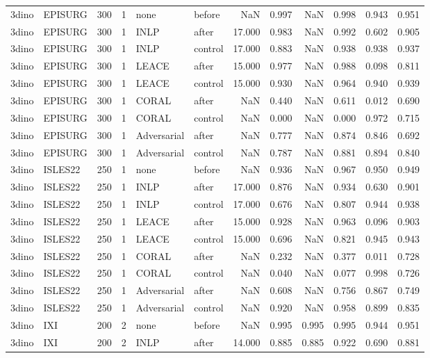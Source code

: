 \begin{tabular}{llrrllrrrrrr}
3dino & EPISURG & 300 & 1 & none & before & NaN & 0.997 & NaN & 0.998 & 0.943 & 0.951 \\
3dino & EPISURG & 300 & 1 & INLP & after & 17.000 & 0.983 & NaN & 0.992 & 0.602 & 0.905 \\
3dino & EPISURG & 300 & 1 & INLP & control & 17.000 & 0.883 & NaN & 0.938 & 0.938 & 0.937 \\
3dino & EPISURG & 300 & 1 & LEACE & after & 15.000 & 0.977 & NaN & 0.988 & 0.098 & 0.811 \\
3dino & EPISURG & 300 & 1 & LEACE & control & 15.000 & 0.930 & NaN & 0.964 & 0.940 & 0.939 \\
3dino & EPISURG & 300 & 1 & CORAL & after & NaN & 0.440 & NaN & 0.611 & 0.012 & 0.690 \\
3dino & EPISURG & 300 & 1 & CORAL & control & NaN & 0.000 & NaN & 0.000 & 0.972 & 0.715 \\
3dino & EPISURG & 300 & 1 & Adversarial & after & NaN & 0.777 & NaN & 0.874 & 0.846 & 0.692 \\
3dino & EPISURG & 300 & 1 & Adversarial & control & NaN & 0.787 & NaN & 0.881 & 0.894 & 0.840 \\
3dino & ISLES22 & 250 & 1 & none & before & NaN & 0.936 & NaN & 0.967 & 0.950 & 0.949 \\
3dino & ISLES22 & 250 & 1 & INLP & after & 17.000 & 0.876 & NaN & 0.934 & 0.630 & 0.901 \\
3dino & ISLES22 & 250 & 1 & INLP & control & 17.000 & 0.676 & NaN & 0.807 & 0.944 & 0.938 \\
3dino & ISLES22 & 250 & 1 & LEACE & after & 15.000 & 0.928 & NaN & 0.963 & 0.096 & 0.903 \\
3dino & ISLES22 & 250 & 1 & LEACE & control & 15.000 & 0.696 & NaN & 0.821 & 0.945 & 0.943 \\
3dino & ISLES22 & 250 & 1 & CORAL & after & NaN & 0.232 & NaN & 0.377 & 0.011 & 0.728 \\
3dino & ISLES22 & 250 & 1 & CORAL & control & NaN & 0.040 & NaN & 0.077 & 0.998 & 0.726 \\
3dino & ISLES22 & 250 & 1 & Adversarial & after & NaN & 0.608 & NaN & 0.756 & 0.867 & 0.749 \\
3dino & ISLES22 & 250 & 1 & Adversarial & control & NaN & 0.920 & NaN & 0.958 & 0.899 & 0.835 \\
3dino & IXI & 200 & 2 & none & before & NaN & 0.995 & 0.995 & 0.995 & 0.944 & 0.951 \\
3dino & IXI & 200 & 2 & INLP & after & 14.000 & 0.885 & 0.885 & 0.922 & 0.690 & 0.881 \\

\end{tabular}
